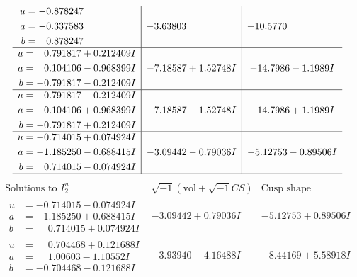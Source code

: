 \documentclass[1p]{elsarticle_modified}
\theoremstyle{definition}
\newcommand{\I}{\sqrt{-1}}
\begin{document}
$$\begin{array}{c|c|c}
\begin{aligned}
u &= -0.878247\phantom{ +0.000000I} \\
a &= -0.337583\phantom{ +0.000000I} \\
b &= \phantom{-}0.878247\phantom{ +0.000000I}\end{aligned}
 & -3.63803\phantom{ +0.000000I} & -10.5770\phantom{ +0.000000I} \\ \hline\begin{aligned}
u &= \phantom{-}0.791817 + 0.212409 I \\
a &= \phantom{-}0.104106 - 0.968399 I \\
b &= -0.791817 - 0.212409 I\end{aligned}
 & -7.18587 + 1.52748 I & -14.7986 - 1.1989 I \\ \hline\begin{aligned}
u &= \phantom{-}0.791817 - 0.212409 I \\
a &= \phantom{-}0.104106 + 0.968399 I \\
b &= -0.791817 + 0.212409 I\end{aligned}
 & -7.18587 - 1.52748 I & -14.7986 + 1.1989 I \\ \hline\begin{aligned}
u &= -0.714015 + 0.074924 I \\
a &= -1.185250 - 0.688415 I \\
b &= \phantom{-}0.714015 - 0.074924 I\end{aligned}
 & -3.09442 - 0.79036 I & -5.12753 - 0.89506 I\\
 \hline 
 \end{array}$$\newpage$$\begin{array}{c|c|c}  
\text{Solutions to }I^u_{2}& \I (\text{vol} + \sqrt{-1}CS) & \text{Cusp shape}\\
 \hline 
\begin{aligned}
u &= -0.714015 - 0.074924 I \\
a &= -1.185250 + 0.688415 I \\
b &= \phantom{-}0.714015 + 0.074924 I\end{aligned}
 & -3.09442 + 0.79036 I & -5.12753 + 0.89506 I \\ \hline\begin{aligned}
u &= \phantom{-}0.704468 + 0.121688 I \\
a &= \phantom{-}1.00603 - 1.10552 I \\
b &= -0.704468 - 0.121688 I\end{aligned}
 & -3.93940 - 4.16488 I & -8.44169 + 5.58918 I \\ \hline\begin{aligned}

\end{aligned}
\end{array}$$
\end{document}
